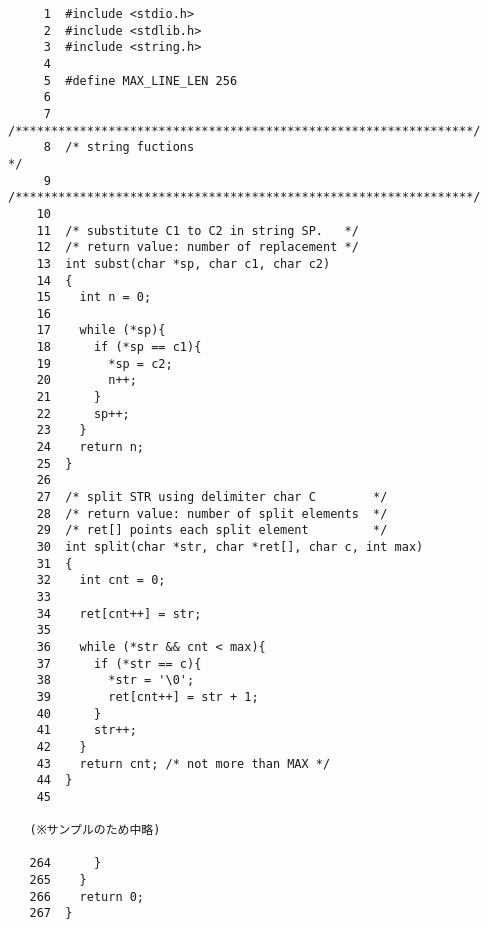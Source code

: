 \documentclass[a4j,11pt]{jarticle}
\begin{document}
%
%
{\fontsize{10pt}{11pt} \selectfont
\begin{verbatim}
     1  #include <stdio.h>
     2  #include <stdlib.h>
     3  #include <string.h>
     4
     5  #define MAX_LINE_LEN 256
     6
     7  /****************************************************************/
     8  /* string fuctions                                              */
     9  /****************************************************************/
    10
    11  /* substitute C1 to C2 in string SP.   */
    12  /* return value: number of replacement */
    13  int subst(char *sp, char c1, char c2)
    14  {
    15    int n = 0;
    16
    17    while (*sp){
    18      if (*sp == c1){
    19        *sp = c2;
    20        n++;
    21      }
    22      sp++;
    23    }
    24    return n;
    25  }
    26
    27  /* split STR using delimiter char C        */
    28  /* return value: number of split elements  */
    29  /* ret[] points each split element         */
    30  int split(char *str, char *ret[], char c, int max)
    31  {
    32    int cnt = 0;
    33
    34    ret[cnt++] = str;
    35
    36    while (*str && cnt < max){
    37      if (*str == c){
    38        *str = '\0';
    39        ret[cnt++] = str + 1;
    40      }
    41      str++;
    42    }
    43    return cnt; /* not more than MAX */
    44  }
    45

   (※サンプルのため中略)

   264      }
   265    }
   266    return 0;
   267  }
\end{verbatim}
}

\end{document}
